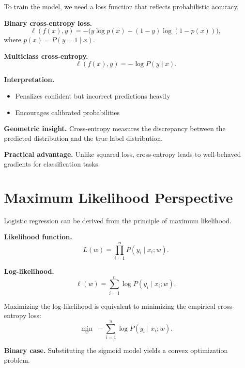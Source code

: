 To train the model, we need a loss function that reflects probabilistic accuracy.

\medskip

\noindent
\textbf{Binary cross-entropy loss.}
\[
\ell(f(x), y) = -\big( y \log p(x) + (1-y)\log(1 - p(x)) \big),
\]
where $p(x) = P(y=1 \mid x)$.

\medskip

\noindent
\textbf{Multiclass cross-entropy.}
\[
\ell(f(x), y) = -\log P(y \mid x).
\]

\medskip

\noindent
\textbf{Interpretation.}
\begin{itemize}
    \item Penalizes confident but incorrect predictions heavily
    \item Encourages calibrated probabilities
\end{itemize}

\medskip

\noindent
\textbf{Geometric insight.}  
Cross-entropy measures the discrepancy between the predicted distribution and the true label distribution.

\medskip

\noindent
\textbf{Practical advantage.}  
Unlike squared loss, cross-entropy leads to well-behaved gradients for classification tasks.

\section{Maximum Likelihood Perspective}

Logistic regression can be derived from the principle of maximum likelihood.

\medskip

\noindent
\textbf{Likelihood function.}
\[
L(w) = \prod_{i=1}^n P(y_i \mid x_i; w).
\]

\medskip

\noindent
\textbf{Log-likelihood.}
\[
\ell(w) = \sum_{i=1}^n \log P(y_i \mid x_i; w).
\]

\medskip

\noindent
Maximizing the log-likelihood is equivalent to minimizing the empirical cross-entropy loss:
\[
\min_w \; -\sum_{i=1}^n \log P(y_i \mid x_i; w).
\]

\medskip

\noindent
\textbf{Binary case.}  
Substituting the sigmoid model yields a convex optimization problem.

\medskip

